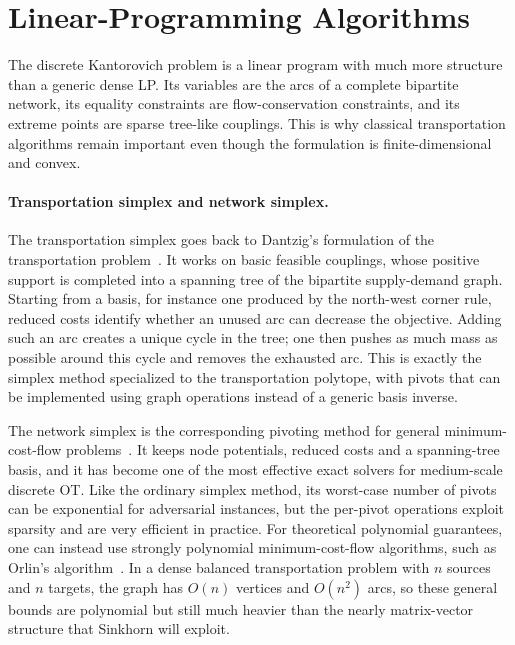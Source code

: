 \section{Linear-Programming Algorithms}
\label{sec-kantorovich-lp-algorithms}

The discrete Kantorovich problem is a linear program with much more structure than a generic dense LP\@. Its variables are the arcs of a complete bipartite network, its equality constraints are flow-conservation constraints, and its extreme points are sparse tree-like couplings. This is why classical transportation algorithms remain important even though the formulation is finite-dimensional and convex.

\paragraph{Transportation simplex and network simplex.}

The transportation simplex goes back to Dantzig's formulation of the transportation problem~\cite{Dantzig51}. It works on basic feasible couplings, whose positive support is completed into a spanning tree of the bipartite supply-demand graph. Starting from a basis, for instance one produced by the north-west corner rule, reduced costs identify whether an unused arc can decrease the objective. Adding such an arc creates a unique cycle in the tree; one then pushes as much mass as possible around this cycle and removes the exhausted arc. This is exactly the simplex method specialized to the transportation polytope, with pivots that can be implemented using graph operations instead of a generic basis inverse.

The network simplex is the corresponding pivoting method for general minimum-cost-flow problems~\cite{bertsekas1988dual}. It keeps node potentials, reduced costs and a spanning-tree basis, and it has become one of the most effective exact solvers for medium-scale discrete OT\@. Like the ordinary simplex method, its worst-case number of pivots can be exponential for adversarial instances, but the per-pivot operations exploit sparsity and are very efficient in practice. For theoretical polynomial guarantees, one can instead use strongly polynomial minimum-cost-flow algorithms, such as Orlin's algorithm~\cite{Orlin1997}. In a dense balanced transportation problem with $n$ sources and $n$ targets, the graph has $O(n)$ vertices and $O(n^2)$ arcs, so these general bounds are polynomial but still much heavier than the nearly matrix-vector structure that Sinkhorn will exploit.

